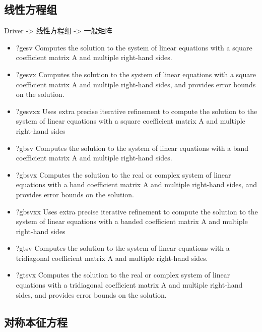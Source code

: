 \subsection{线性方程组}
Driver -> 线性方程组 -> 一般矩阵
\begin{itemize}
\item ?gesv Computes the solution to the system of linear equations with a square coefficient matrix A and multiple right-hand sides.
\item ?gesvx Computes the solution to the system of linear equations with a square coefficient matrix A and multiple right-hand sides, and provides error bounds on the solution.
\item ?gesvxx Uses extra precise iterative refinement to compute the solution to the system of linear equations with a square coefficient matrix A and multiple right-hand sides
\item ?gbsv Computes the solution to the system of linear equations with a band coefficient matrix A and multiple right-hand sides.
\item ?gbsvx Computes the solution to the real or complex system of linear equations with a band coefficient matrix A and multiple right-hand sides, and provides error bounds on the solution.
\item ?gbsvxx Uses extra precise iterative refinement to compute the solution to the system of linear equations with a banded coefficient matrix A and multiple right-hand sides
\item ?gtsv Computes the solution to the system of linear equations with a tridiagonal coefficient matrix A and multiple right-hand sides.
\item ?gtsvx Computes the solution to the real or complex system of linear equations with a tridiagonal coefficient matrix A and multiple right-hand sides, and provides error bounds on the solution.
\end{itemize}


\subsection{对称本征方程}
